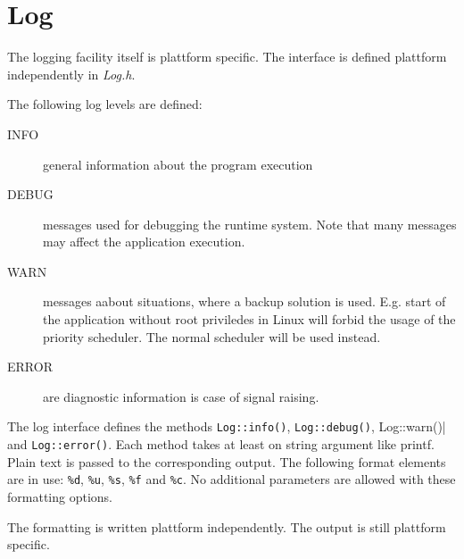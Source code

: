 \chapter{Log}
The logging facility itself is plattform specific. The interface is 
defined plattform independently in {\em Log.h}.

The following log levels are defined:
\begin{description}
\item[INFO] general information about the program execution
\item[DEBUG] messages used for debugging the runtime system. Note that
   many messages may affect the application execution.
\item[WARN] messages aabout situations, where a backup solution is used.
E.g. start of the application without root priviledes in Linux will 
forbid the usage of the priority scheduler. The normal scheduler will be 
used instead.
\item[ERROR] are diagnostic information is case of signal raising.
\end{description}

The log interface defines the methods
\verb|Log::info()|, \verb|Log::debug()|, Log::warn()| and \verb|Log::error()|.
Each method takes at least on string argument like printf.
Plain text is passed to the corresponding output.
The following format elements are in use: \verb|%d|, \verb|%u|, \verb|%s|,
\verb|%f| and \verb|%c|. No additional parameters are allowed with these 
formatting options.

The formatting is written plattform independently.
The output is still plattform specific.
